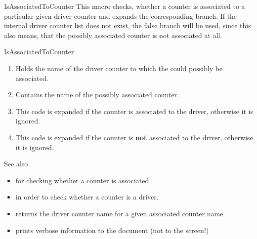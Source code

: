 \documentclass[12pt,paper=a4]{article}
\begin{document}
\begin{docCommand}{IsAssociatedToCounter}{}
This macro checks, whether a counter is associated to a particular given driver counter and expands the corresponding branch. If the internal driver counter list does not exist, the false branch will be used, since this also means, that the possibly associated counter is not associated at all. 



\begin{docCommandArgs}{IsAssociatedToCounter}%

\begin{enumerate}[label={\textcolor{blue}{\#\arabic*}}]
  \item {} 

    Holds the name of the driver counter to which  the could possibly be associated.
\item {}

  Contains the name of the possibly associated counter.

\item {}

  This code is expanded if the counter is associated to the driver, otherwise it is ignored.

\item {}

  This code is expanded if the counter is \textbf{not} associated to the driver, otherwise it is ignored.

\end{enumerate}
\end{docCommandArgs}


\begin{dispExample}

\end{dispExample}

See also

\begin{itemize}
  \item {} for checking whether a counter is associated 
  \item {} in order to check whether a counter is a driver. 
  \item {} returns the driver counter name for a given associated counter name
  \item {} prints verbose information to the document (not to the screen!)
\end{itemize}


\end{docCommand}
\end{document}
